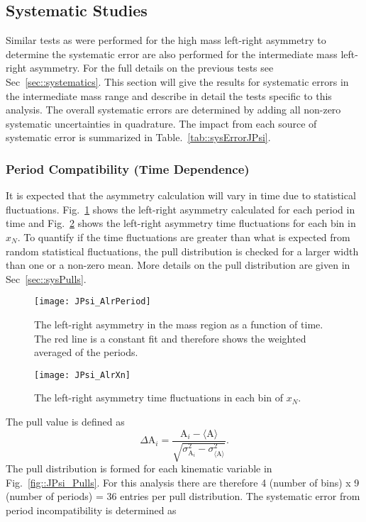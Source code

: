 \subsection{Systematic Studies}
Similar tests as were performed for the high mass left-right asymmetry to
determine the systematic error are also performed for the intermediate mass
left-right asymmetry.  For the full details on the previous tests see
Sec~\ref{sec::systematics}.  This section will give the results for systematic
errors in the intermediate mass range and describe in detail the tests specific
to this analysis.  The overall systematic errors are determined by adding all
non-zero systematic uncertainties in quadrature.  The impact from each source of
systematic error is summarized in Table.~\ref{tab::sysErrorJPsi}.

\subsubsection{Period Compatibility (Time Dependence)}
It is expected that the asymmetry calculation will vary in time due to
statistical fluctuations.  Fig.~\ref{fig::JPsi_AlrPeriod} shows the left-right
asymmetry calculated for each period in time and Fig.~\ref{fig::JPsi_AlrXn}
shows the left-right asymmetry time fluctuations for each bin in $x_N$.  To
quantify if the time fluctuations are greater than what is expected from random
statistical fluctuations, the pull distribution is checked for a larger width
than one or a non-zero mean.  More details on the pull distribution are given in
Sec~\ref{sec::sysPulls}.

\begin{figure}[h!t]
  \centering \texttt{[image: JPsi\_AlrPeriod]}
  \caption{The left-right asymmetry in the {\jp} mass region as a function of
    time.  The red line is a constant fit and therefore shows the weighted
    averaged of the periods.}
  \label{fig::JPsi_AlrPeriod}
\end{figure}

\begin{figure}[h!t]
  \centering
  \texttt{[image: JPsi\_AlrXn]}
  \caption{The left-right asymmetry time fluctuations in each bin of $x_N$.}
  \label{fig::JPsi_AlrXn}
\end{figure}

The pull value is defined as
\begin{equation}
  \label{eq::pullJPsi}
  \Delta\mathrm{A}_i =
  \frac{
    \mathrm{A}_i - \langle \mathrm{A} \rangle
  }{
    \sqrt{
      \sigma^2_{\mathrm{A}_i} - \sigma^2_{\langle \mathrm{A} \rangle}
    }
  }.
\end{equation}
\noindent
The pull distribution is formed for each kinematic variable in
Fig.~\ref{fig::JPsi_Pulls}.  For this analysis there are therefore 4 (number of
bins) x 9 (number of periods) = 36 entries per pull distribution.  The
systematic error from period incompatibility is determined as

